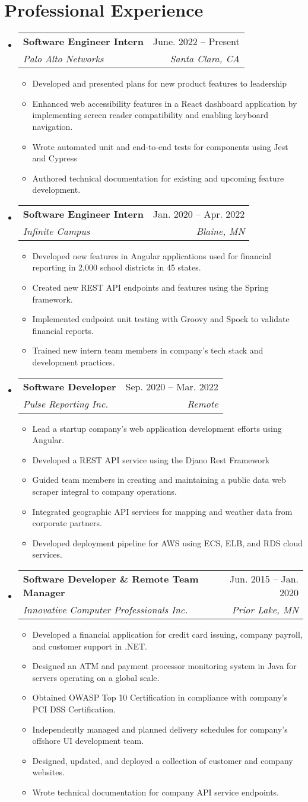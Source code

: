\documentclass[letterpaper,11pt]{article}
\makeatletter
\newcommand{\resumeItem}[1]{\item\small{{#1 \vspace{-2pt}}}}
\newcommand{\resumeSection}[2]{\section{#1}\begin{itemize}[leftmargin=0.15in, label={}]#2\end{itemize}}
\newcommand{\resumeItemHeading}[4]{\vspace{-2pt}\item{\begin{tabular*}{0.97\textwidth}[t]{l@{\extracolsep{\fill}}r}\textbf{#1} & #2\\\textit{\small#3} & \textit{\small #4}\\\end{tabular*}\vspace{-7pt}}}
\newcommand{\resumeItemList}[1]{\begin{itemize}#1\end{itemize}\vspace{-5pt}}
\makeatother
\begin{document}
\resumeSection{Professional Experience}{
	\resumeItemHeading{Software Engineer Intern}{June. 2022 -- Present}{Palo Alto Networks}{Santa Clara, CA}
	\resumeItemList{
		\resumeItem{Developed and presented plans for new product features to leadership}
		\resumeItem{Enhanced web accessibility features in a React dashboard application by implementing screen reader compatibility and enabling keyboard navigation.}
		\resumeItem{Wrote automated unit and end-to-end tests for components using Jest and Cypress}
		\resumeItem{Authored technical documentation for existing and upcoming feature development.}
	}

	\resumeItemHeading{Software Engineer Intern}{Jan. 2020 -- Apr. 2022}{Infinite Campus}{Blaine, MN}
	\resumeItemList{
		\resumeItem{Developed new features in Angular applications used for financial reporting in 2,000 school districts in 45 states.}
		\resumeItem{Created new REST API endpoints and features using the Spring framework.}
		\resumeItem{Implemented endpoint unit testing with Groovy and Spock to validate financial reports.}
		\resumeItem{Trained new intern team members in company's tech stack and development practices.}
	}

	\resumeItemHeading{Software Developer}{Sep. 2020 -- Mar. 2022}{Pulse Reporting Inc.}{Remote}
	\resumeItemList{
		\resumeItem{Lead a startup company's web application development efforts using Angular.}
		\resumeItem{Developed a REST API service using the Djano Rest Framework}
		\resumeItem{Guided team members in creating and maintaining a public data web scraper integral to company operations.}
		\resumeItem{Integrated geographic API services for mapping and weather data from corporate partners.}
		\resumeItem{Developed deployment pipeline for AWS using ECS, ELB, and RDS cloud services.}
	}

	\resumeItemHeading{Software Developer \& Remote Team Manager}{Jun. 2015 -- Jan. 2020}{Innovative Computer Professionals Inc.}{Prior Lake, MN}
	\resumeItemList{
		\resumeItem{Developed a financial application for credit card issuing, company payroll, and customer support in .NET.}
		\resumeItem{Designed an ATM and payment processor monitoring system in Java for servers operating on a global scale.}
		\resumeItem{Obtained OWASP Top 10 Certification in compliance with company’s PCI DSS Certification.}
		\resumeItem{Independently managed and planned delivery schedules for company’s offshore UI development team.}
		\resumeItem{Designed, updated, and deployed a collection of customer and company websites.}
		\resumeItem{Wrote technical documentation for company API service endpoints.}
	}
}
\end{document}
